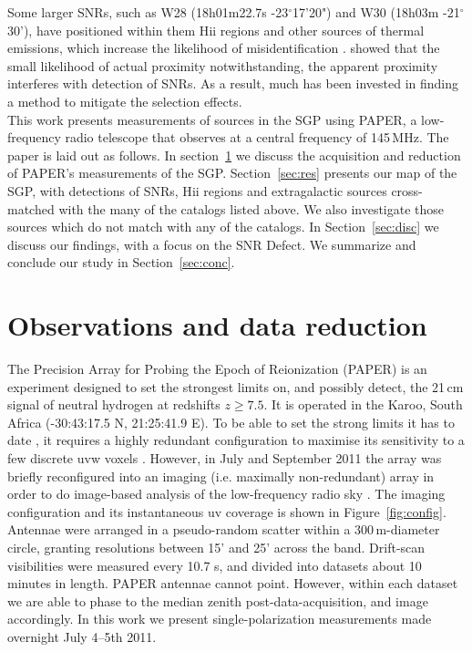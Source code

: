 \documentclass[useAMS,usenatbib]{mn2e}
\begin{document}
Some larger SNRs, such as W28 (18h01m22.7s -23$^{\circ}$17'20") and W30 (18h03m -21$^{\circ}$30'), have positioned within them H{\sc ii} regions and other sources of thermal emissions, which increase the likelihood of misidentification \citep{Andrews.85}. \cite{Brogan.06} showed that the small likelihood of actual proximity notwithstanding, the apparent proximity interferes with detection of SNRs.  As a result, much has been invested in finding a method to mitigate the selection effects.\\

This work presents measurements of sources in the SGP using PAPER, a low-frequency radio telescope that observes at a central frequency of 145\,MHz. The paper is laid out as follows. In section~\ref{sec:obs} we discuss the acquisition and reduction of PAPER's measurements of the SGP. Section~\ref{sec:res} presents our map of the SGP, with detections of SNRs, H{\sc ii} regions and extragalactic sources cross-matched with the many of the catalogs listed above. We also investigate those sources which do not match with any of the catalogs. In Section~\ref{sec:disc} we discuss our findings, with a focus on the SNR Defect. We summarize and conclude our study in Section~\ref{sec:conc}.

\section{Observations and data reduction}
\label{sec:obs}

The Precision Array for Probing the Epoch of Reionization (PAPER) is an experiment designed to set the strongest limits on, and possibly detect, the 21\,cm signal of neutral hydrogen at redshifts $z \geq 7.5$. It is operated in the Karoo, South Africa (-30:43:17.5 N, 21:25:41.9 E). To be able to set the strong limits it has to date \citep{Parsons.14, Jacobs.14, Ali.15, Moore.15}, it requires a highly redundant configuration to maximise its sensitivity to a few discrete uvw voxels \citep{Parsons.12}. However, in July and September 2011 the array was briefly reconfigured into an imaging (i.e. maximally non-redundant) array in order to do image-based analysis of the low-frequency radio sky \citep[e.g.][]{Jacobs.11, Stefan.13}. The imaging configuration and its instantaneous uv coverage is shown in Figure~\ref{fig:config}. Antennae were arranged in a pseudo-random scatter within a 300\,m-diameter circle, granting resolutions between 15' and 25' across the band.
Drift-scan visibilities were measured every 10.7 s, and divided into datasets about 10 minutes in length. PAPER antennae cannot point. However, within each dataset we are able to phase to the median zenith post-data-acquisition, and image accordingly. In this work we present single-polarization measurements made overnight July 4--5th 2011.
\end{document}
